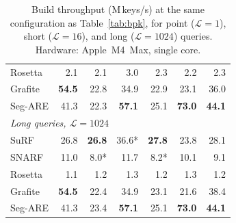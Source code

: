 \begin{table}[H]
\begin{tabular}{@{}lrrrrrr@{}}
        Rosetta & 2.1           & 2.1              & 3.0              & 2.3              & 2.2              & 2.3              \\
        Grafite & \textbf{54.5} & 22.8             & 34.9             & 22.9             & 23.1             & 36.0             \\
        Seg-ARE & 41.3          & 22.3             & \textbf{57.1}    & 25.1             & \textbf{73.0}    & \textbf{44.1}    \\
        \midrule
        \multicolumn{7}{l}{\textit{Long queries, $\mathcal{L} = 1024$}} \\
        \midrule
        SuRF    & 26.8          & \textbf{26.8}    & 36.6*            & \textbf{27.8}    & 23.8             & 28.1             \\
        SNARF   & 11.0          & 8.0*             & 11.7             & 8.2*             & 10.1             & 9.1              \\
        Rosetta & 1.1           & 1.2              & 1.3              & 1.2              & 1.3              & 1.2              \\
        Grafite & \textbf{54.5} & 22.4             & 34.9             & 23.1             & 21.6             & 38.4             \\
        Seg-ARE & 41.3          & 23.4             & \textbf{57.1}    & 25.1             & \textbf{73.0}    & \textbf{44.1}    \\
        \bottomrule
    \end{tabular}
    \caption{Build throughput (M\,keys/s) at the same configuration as
        Table~\ref{tab:bpk}, for point ($\mathcal{L}=1$),
        short ($\mathcal{L}=16$), and long ($\mathcal{L}=1024$) queries.
        Hardware: Apple~M4~Max, single core.}
    \label{tab:throughput}
\end{table}
